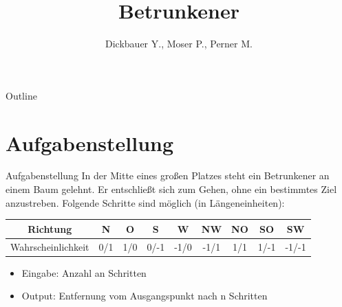 

\title[BSP07 - Betrunkener]{Betrunkener}
\author{Dickbauer Y., Moser P., Perner M.}



\begin{frame}
  \titlepage
\end{frame}

\begin{frame}{Outline}
  \tableofcontents
\end{frame}

\section{Aufgabenstellung}
\begin{frame}{Aufgabenstellung}
In der Mitte eines großen Platzes steht ein Betrunkener an einem Baum gelehnt. Er
entschließt sich zum Gehen, ohne ein bestimmtes Ziel anzustreben. Folgende Schritte sind
möglich (in Längeneinheiten):
\begin{center}
\begin{tabular}{c|c|c|c|c|c|c|c|c}
Richtung & N & O & S & W & NW & NO & SO & SW \\ 
\hline 
Wahrscheinlichkeit &0/1&1/0&0/-1&-1/0&-1/1&1/1&1/-1&-1/-1\\ 
\end{tabular} 
\end{center}
\begin{itemize}
  \item Eingabe: Anzahl an Schritten
  \item Output: Entfernung vom Ausgangspunkt nach n Schritten
\end{itemize}

\end{frame}

